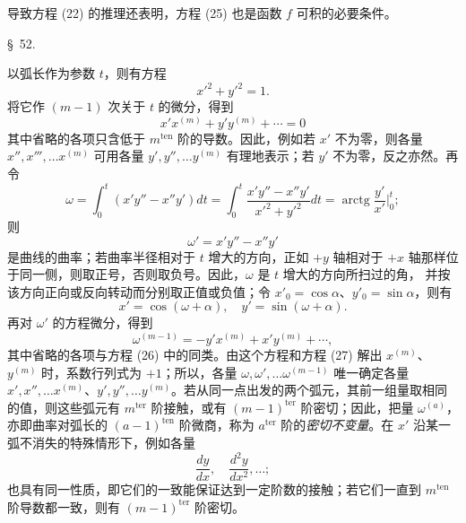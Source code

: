 \documentclass[11pt,a4paper,leqno]{article}
\begin{document}
导致方程 (22) 的推理还表明，方程 (25) 也是函数 $f$ 可积的必要条件。

\begin{center}
{\large \S~52.}
\end{center}

以弧长作为参数 $t$，则有方程
\[
x'^2+y'^2=1.
\]
将它作 $(m-1)$ 次关于 $t$ 的微分，得到
\begin{equation}\tag{26}
x'x^{(m)}+y'y^{(m)}+\cdots=0
\end{equation}
其中省略的各项只含低于 $m^{\mathrm{ten}}$ 阶的导数。因此，例如若 $x'$ 不为零，则各量 $x'',x''',\ldots x^{(m)}$ 可用各量 $y',y'',\ldots y^{(m)}$ 有理地表示；若 $y'$ 不为零，反之亦然。再令
\[
\omega=\int_0^t(x'y''-x''y')dt=\int_0^t\frac{x'y''-x''y'}{x'^2+y'^2}dt=\operatorname{arctg}\frac{y'}{x'}\bigg|_0^t;
\]
则
\[
\omega'=x'y''-x''y'
\]
是曲线的曲率；若曲率半径相对于 $t$ 增大的方向，正如 $+y$ 轴相对于 $+x$ 轴那样位于同一侧，则取正号，否则取负号。因此，$\omega$ 是 $t$ 增大的方向所扫过的角，
并按该方向正向或反向转动而分别取正值或负值；令 $x'_0=\cos\alpha$、$y'_0=\sin\alpha$，则有
\[
x'=\cos(\omega+\alpha),\quad y'=\sin(\omega+\alpha).
\]
再对 $\omega'$ 的方程微分，得到
\begin{equation}\tag{27}
\omega^{(m-1)}=-y'x^{(m)}+x'y^{(m)}+\cdots,
\end{equation}
其中省略的各项与方程 (26) 中的同类。由这个方程和方程 (27) 解出 $x^{(m)}$、$y^{(m)}$ 时，系数行列式为 $+1$；所以，各量 $\omega,\omega',\ldots\omega^{(m-1)}$ 唯一确定各量 $x',x'',\ldots x^{(m)}$、$y',y'',\ldots y^{(m)}$。若从同一点出发的两个弧元，其前一组量取相同的值，则这些弧元有 $m^{\mathrm{ter}}$ 阶接触，或有 $(m-1)^{\mathrm{ter}}$ 阶密切；因此，把量 $\omega^{(a)}$，亦即曲率对弧长的 $(a-1)^{\mathrm{ten}}$ 阶微商，称为 $a^{\mathrm{ter}}$ 阶的\emph{密切不变量}。在 $x'$ 沿某一弧不消失的特殊情形下，例如各量
\[
\frac{dy}{dx},\quad \frac{d^2y}{dx^2},\ldots;
\]
也具有同一性质，即它们的一致能保证达到一定阶数的接触；若它们一直到 $m^{\mathrm{ten}}$ 阶导数都一致，则有 $(m-1)^{\mathrm{ter}}$ 阶密切。
\end{document}
